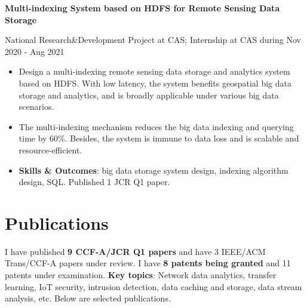\documentclass[letterpaper,10.9pt]{article}
\begin{document}
\vspace{1pt}

\textbf{Multi-indexing System based on HDFS for Remote Sensing Data Storage}

National Research\&Development Project at CAS; Internship at CAS during Nov 2020 - Aug 2021

\begin{itemize}
  \setlength\itemsep{2.0pt}
  \item Design a multi-indexing remote sensing data storage and analytics system based on HDFS. With low latency, the system benefits geospatial big data storage and analytics, and is broadly applicable under various big data scenarios. 
  \item The multi-indexing mechanism reduces the big data indexing and querying time by 60\%. Besides, the system is immune to data loss and is scalable and resource-efficient.
  \item \textbf{Skills \& Outcomes}: big data storage system design, indexing algorithm design, SQL. Published 1 JCR Q1 paper. 
\end{itemize}




\section{\textbf{Publications}}

I have published \textbf{9 CCF-A/JCR Q1 papers} and have 3 IEEE/ACM Trans/CCF-A papers under review. I have \textbf{8 patents being granted} and 11 patents under examination. \textbf{Key topics}: Network data analytics, transfer learning, IoT security, intrusion detection, data caching and storage, data stream analysis, etc. Below are selected publications. 
\end{document}
